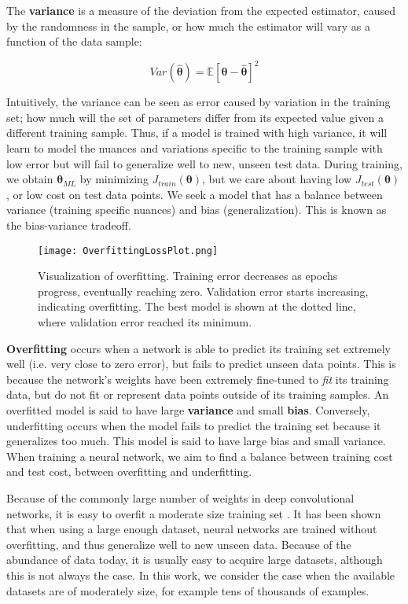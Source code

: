 The \textbf{variance} is a measure of the deviation from the expected estimator, caused by
the randomness in the sample, or how much the estimator will vary as a function of the data sample:

\[ Var(\bm{\hat{\theta}}) = \mathbb{E}{[\bm{\theta} - \bm{\hat{\theta}}]^{2}}\]

Intuitively, the variance can be seen as error caused by variation in the training set; how much will the set of parameters differ from its expected value given a different training sample.
Thus, if a model is trained with high variance, it will learn to model the nuances and variations specific to the training sample with low error but will fail to generalize well to new, unseen test data.
During training, we obtain $\bm{\theta}_{ML}$ by minimizing $J_{train}(\bm{\theta})$, but we care about having low $J_{test}(\bm{\theta})$, or low cost
on test data points. We seek a model that has a balance between variance (training specific nuances) and bias (generalization). This is known as the bias-variance tradeoff.

\begin{figure}[H]
\centering
\texttt{[image: OverfittingLossPlot.png]}
\caption{Visualization of overfitting. Training error decreases as epochs progress, eventually reaching zero.
Validation error starts increasing, indicating overfitting. The best model is shown at the dotted line, where
validation error reached its minimum.}
\end{figure}

\textbf{Overfitting} occurs when a network is able to predict its training set extremely well (i.e. very close to zero error), but fails to predict
unseen data points. This is because the network's weights have been extremely fine-tuned to \textit{fit} its training data, but do not fit or represent
data points outside of its training samples.
An overfitted model is said to have large \textbf{variance} and small \textbf{bias}. Conversely, underfitting occurs when the model fails to predict
the training set because it generalizes too much. This model is said to have large bias and small variance. When training a neural network,
we aim to find a balance between training cost and test cost, between overfitting and underfitting.

Because of the commonly large number of weights in deep convolutional networks, it is easy to overfit a moderate size training set \cite{hinton2012improving}.
It has been shown that when using a large enough dataset, neural networks are trained without overfitting, and thus generalize well
to new unseen data. Because of the abundance of data today, it is usually easy to acquire large datasets, although this is not always the case.
In this work, we consider the case when the available datasets are of moderately size, for example tens of thousands of examples.

